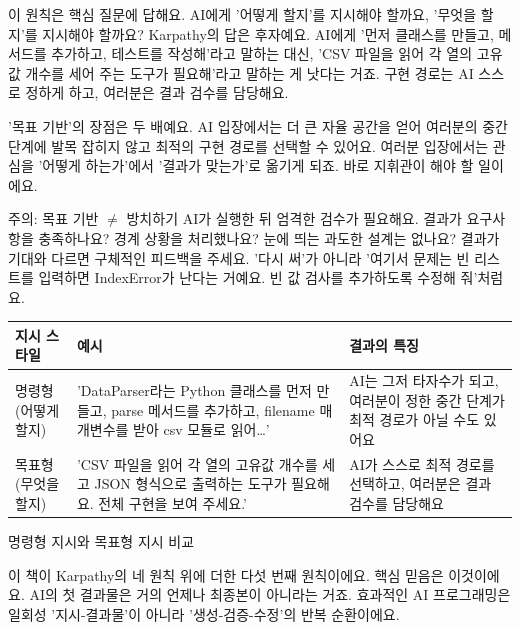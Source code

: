 
이 원칙은 핵심 질문에 답해요. AI에게 '어떻게 할지'를 지시해야 할까요, '무엇을 할지'를 지시해야 할까요? Karpathy의 답은 후자예요. AI에게 '먼저 클래스를 만들고, 메서드를 추가하고, 테스트를 작성해'라고 말하는 대신, 'CSV 파일을 읽어 각 열의 고유값 개수를 세어 주는 도구가 필요해'라고 말하는 게 낫다는 거죠. 구현 경로는 AI 스스로 정하게 하고, 여러분은 결과 검수를 담당해요.

'목표 기반'의 장점은 두 배예요. AI 입장에서는 더 큰 자율 공간을 얻어 여러분의 중간 단계에 발목 잡히지 않고 최적의 구현 경로를 선택할 수 있어요. 여러분 입장에서는 관심을 '어떻게 하는가'에서 '결과가 맞는가'로 옮기게 되죠. 바로 지휘관이 해야 할 일이에요.

\begin{tcbwarn}{주의: 목표 기반 $\neq$ 방치하기}
AI가 실행한 뒤 엄격한 검수가 필요해요. 결과가 요구사항을 충족하나요? 경계 상황을 처리했나요? 눈에 띄는 과도한 설계는 없나요? 결과가 기대와 다르면 구체적인 피드백을 주세요. '다시 써'가 아니라 '여기서 문제는 빈 리스트를 입력하면 IndexError가 난다는 거예요. 빈 값 검사를 추가하도록 수정해 줘'처럼요.

\end{tcbwarn}

\begin{center}
\begin{tabularx}{\linewidth}{|X|X|X|}
\hline
\textbf{지시 스타일} & \textbf{예시} & \textbf{결과의 특징} \tabularnewline
\hline
명령형(어떻게 할지) & 'DataParser라는 Python 클래스를 먼저 만들고, parse 메서드를 추가하고, filename 매개변수를 받아 csv 모듈로 읽어…' & AI는 그저 타자수가 되고, 여러분이 정한 중간 단계가 최적 경로가 아닐 수도 있어요 \tabularnewline
목표형(무엇을 할지) & 'CSV 파일을 읽어 각 열의 고유값 개수를 세고 JSON 형식으로 출력하는 도구가 필요해요. 전체 구현을 보여 주세요.' & AI가 스스로 최적 경로를 선택하고, 여러분은 결과 검수를 담당해요 \tabularnewline
\hline
\end{tabularx}
\end{center}

\begin{center}\small\color{gray}명령형 지시와 목표형 지시 비교\end{center}


이 책이 Karpathy의 네 원칙 위에 더한 다섯 번째 원칙이에요. 핵심 믿음은 이것이에요. AI의 첫 결과물은 거의 언제나 최종본이 아니라는 거죠. 효과적인 AI 프로그래밍은 일회성 '지시-결과물'이 아니라 '생성-검증-수정'의 반복 순환이에요.

